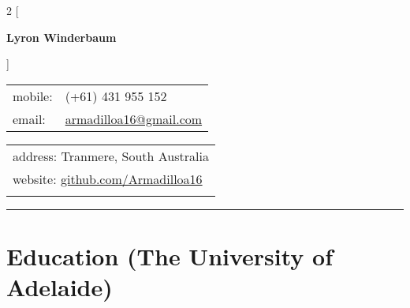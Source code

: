 \documentclass[a4paper,12pt]{report}
\begin{document}
 

\begin{multicols}{2}
[
\begin{center}
{\Large \textbf{Lyron Winderbaum}} \\ \vspace{4mm}
\end{center}
]

\begin{flushleft}
\begin{tabular}{ll}
mobile: & (+61) 431 955 152 \\
email: & \href{mailto:armadilloa16@gmail.com}{armadilloa16@gmail.com} \\
\end{tabular}
\end{flushleft}

\begin{flushright}
\begin{tabular}{l}
address: Tranmere, South Australia \\
website: \href{https://github.com/Armadilloa16}{github.com/Armadilloa16} \\ %
{}
\end{tabular}
\end{flushright}
\end{multicols}                                  

\vspace{-0.4cm}
\hrule
\vspace{-0.2cm}

%

\section*{Education (The University of Adelaide)}
\end{document}
